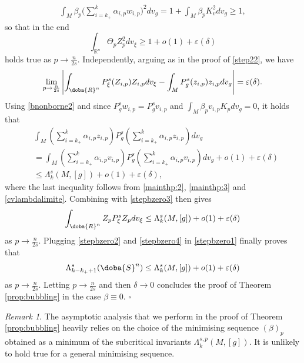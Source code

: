 \documentclass[10pt]{amsart}
\numberwithin{equation}{section}
\newcommand{\R}{\mathbb{R}}
\def\al{{\alpha}}
\def\La{{\Lambda}}
\def\be{{\beta}}
\gdef\mR{\doba{R}}
\gdef\mS{\doba{S}}
\newcommand{\ve}{\varepsilon}
\theoremstyle{plain}
\theoremstyle{remark}
\newtheorem{rem}{Remark}[section]
\begin{document}
$$ \begin{aligned} \int_M \beta_p \big(  \sum_{i =k_+}^k \al_{i,p} w_{i,p} \big)^2 dv_g = 1+ \int_M \be_p K_v^2 dv_g \geq 1, \end{aligned} $$
so that in the end 
\begin{equation} \label{stepbzero2}
  \int_{\R^n} \Theta_p Z_p^2 dv_{\xi} \ge 1 + o(1) + \ve(\delta) 
\end{equation}
holds true as $p \to \frac{n}{2s}$. Independently, arguing as in the proof of \eqref{step22}, we have 
\begin{equation} \label{stepbzero3}
\lim_{p \to \frac{n}{2s}} \left|  \int_{\mR^n} P_\xi^s (Z_{i,p}) Z_{i,p} dv_\xi -  \int_{M} P_g^s (z_{i,p}) z_{i,p} dv_g\right| = \ve(\delta).
\end{equation}
Using \eqref{bnonborne2} and since $P_g^s w_{i,p}=P_g^s v_{i,p}$ and $\int_M \be_p v_{i,p} K_p dv_g=0$, it holds that 
\begin{equation*} 
\begin{aligned} 
 & \int_{M}  \left(  \sum_{i =k_+}^k  \al_{i,p} z_{i,p} \right)  P_g^s  \left(  \sum_{i =k_+}^k  \al_{i,p} z_{i,p} \right) dv_g \\
 & = \int_M  \left(  \sum_{i =k_+}^k  \al_{i,p} v_{i,p} \right) P_g^s\left(\sum_{i =k_+}^k  \al_{i,p} v_{i,p}\right) dv_g + o(1) + \ve(\delta) \\
 &  \leq \Lambda_k^s(M,[g]) + o(1) + \ve(\delta),
\end{aligned} 
\end{equation*}
where the last inequality follows from \eqref{mainthp:2}, \eqref{mainthp:3} and \eqref{cvlambdalimite}. Combining with \eqref{stepbzero3} then gives 
\begin{equation}  \label{stepbzero4}
\begin{aligned} 
 \int_{\mR^n} Z_{p} P_\xi^s Z_{p}  dv_\xi   \leq \Lambda_k^s(M,[g]) + o(1) + \ve(\delta) 
\end{aligned} 
\end{equation}
as $p \to \frac{n}{2s}$. Plugging \eqref{stepbzero2} and \eqref{stepbzero4} in \eqref{stepbzero1} finally proves that 
$$ \La_{k-k_++1}^s(\mS^n) \leq \Lambda_k^s(M,[g]) + o(1) + \ve(\delta) $$
as $p \to \frac{n}{2s}$. Letting $p \to \frac{n}{2s}$ and then $\delta \to 0$ concludes the proof of Theorem \ref{prop:bubbling} in the case $\beta \equiv 0$. $\square$
 
\begin{rem}
The asymptotic analysis that we perform in the proof of Theorem \ref{prop:bubbling} heavily relies on the choice of the minimising sequence $(\beta)_p$ obtained as a minimum of the subcritical invariants $\Lambda_k^{s,p}(M,[g])$. It is unlikely to hold true for a general minimising sequence. 
\end{rem}
\end{document}
